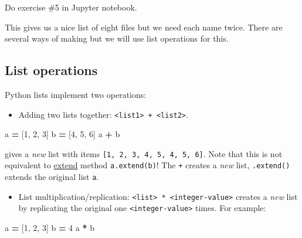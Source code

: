 \documentclass[
]{book}
\newenvironment{Shaded}{\begin{snugshade}}{\end{snugshade}}
\newcommand{\DecValTok}[1]{\textcolor[rgb]{0.00,0.00,0.81}{#1}}
\newcommand{\NormalTok}[1]{#1}
\newcommand{\OperatorTok}[1]{\textcolor[rgb]{0.81,0.36,0.00}{\textbf{#1}}}
\providecommand{\tightlist}{%
  \setlength{\itemsep}{0pt}\setlength{\parskip}{0pt}}
\begin{document}
Do exercise \#5 in Jupyter notebook.

This gives us a nice list of eight files but we need each name twice. There are several ways of making but we will use list operations for this.

\hypertarget{list-operations}{%
\subsection{List operations}\label{list-operations}}

Python lists implement two operations:

\begin{itemize}
\tightlist
\item
  Adding two lists together: \texttt{\textless{}list1\textgreater{}\ +\ \textless{}list2\textgreater{}}.
\end{itemize}

\begin{Shaded}
\begin{Highlighting}[]
\NormalTok{a }\OperatorTok{=}\NormalTok{ [}\DecValTok{1}\NormalTok{, }\DecValTok{2}\NormalTok{, }\DecValTok{3}\NormalTok{]}
\NormalTok{b }\OperatorTok{=}\NormalTok{ [}\DecValTok{4}\NormalTok{, }\DecValTok{5}\NormalTok{, }\DecValTok{6}\NormalTok{]}
\NormalTok{a }\OperatorTok{+}\NormalTok{ b}
\end{Highlighting}
\end{Shaded}

gives a \emph{new} list with items \texttt{{[}1,\ 2,\ 3,\ 4,\ 5,\ 4,\ 5,\ 6{]}}. Note that this is not equivalent to \href{https://docs.python.org/3/tutorial/datastructures.html\#more-on-lists}{extend} method \texttt{a.extend(b)}! The \texttt{+} creates a \emph{new} list, \texttt{.extend()} extends the original list \texttt{a}.

\begin{itemize}
\tightlist
\item
  List multiplication/replication: \texttt{\textless{}list\textgreater{}\ *\ \textless{}integer-value\textgreater{}} creates a \emph{new} list by replicating the original one \texttt{\textless{}integer-value\textgreater{}} times. For example:
\end{itemize}

\begin{Shaded}
\begin{Highlighting}[]
\NormalTok{a }\OperatorTok{=}\NormalTok{ [}\DecValTok{1}\NormalTok{, }\DecValTok{2}\NormalTok{, }\DecValTok{3}\NormalTok{]}
\NormalTok{b }\OperatorTok{=} \DecValTok{4}
\NormalTok{a }\OperatorTok{*}\NormalTok{ b}
\end{Highlighting}
\end{Shaded}
\end{document}
